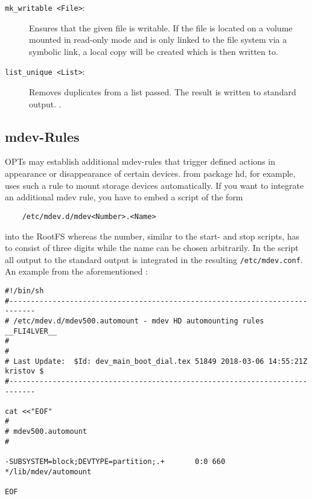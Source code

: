 \begin{description}

\item[\texttt{mk\_writable <File>}:]
Ensures that the given file is writable. If the file is located on a volume
mounted in read-only mode and is only linked to the file system via a
symbolic link, a local copy will be created which is then written to.

\item[\texttt{list\_unique <List>}:]
Removes duplicates from a list passed. The result is written to standard output.
.

\end{description}

\subsection{mdev-Rules}

OPTs may establish additional mdev-rules that trigger defined actions in
appearance or disappearance of certain devices.  from
package hd, for example, uses such a rule to mount storage devices automatically.
If you want to integrate an additional mdev rule, you have to embed a script of
the form

\begin{verbatim}
    /etc/mdev.d/mdev<Number>.<Name>
\end{verbatim}

into the RootFS whereas the number, similar to the start- and stop scripts, has
to consist of three digits while the name can be chosen arbitrarily. In the script
all output to the standard output is integrated in the resulting \texttt{/etc/mdev.conf}.
An example from the aforementioned :

\begin{small}
\begin{verbatim}
#!/bin/sh
#----------------------------------------------------------------------------
# /etc/mdev.d/mdev500.automount - mdev HD automounting rules     __FLI4LVER__
#
#
# Last Update:  $Id: dev_main_boot_dial.tex 51849 2018-03-06 14:55:21Z kristov $
#----------------------------------------------------------------------------

cat <<"EOF"
#
# mdev500.automount
#

-SUBSYSTEM=block;DEVTYPE=partition;.+       0:0 660 */lib/mdev/automount

EOF
\end{verbatim}
\end{small}

